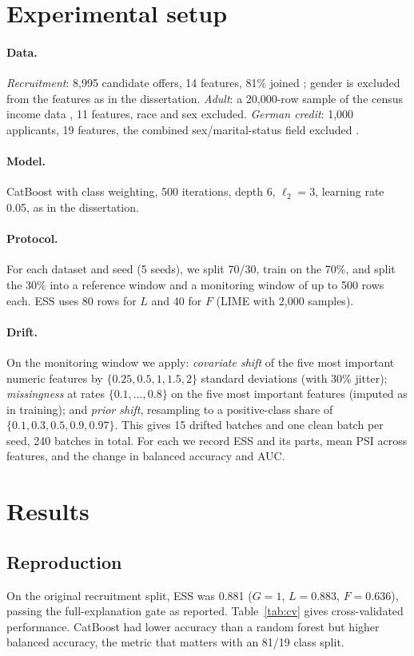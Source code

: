 \documentclass[11pt]{article}
\begin{document}
\section{Experimental setup}
\paragraph{Data.} \emph{Recruitment}: 8{,}995 candidate offers, 14 features, 81\% joined \cite{hrdataset}; gender is excluded from the
features as in the dissertation. \emph{Adult}: a 20{,}000-row sample of the census income data \cite{kohavi1996adult}, 11 features,
race and sex excluded. \emph{German credit}: 1{,}000 applicants, 19 features, the combined sex/marital-status field excluded
\cite{hofmann1994german}.
\paragraph{Model.} CatBoost with class weighting, 500 iterations, depth 6, \(\ell_2=3\), learning rate 0.05, as in the dissertation.
\paragraph{Protocol.} For each dataset and seed (5 seeds), we split 70/30, train on the 70\%, and split the 30\% into a reference
window and a monitoring window of up to 500 rows each. ESS uses 80 rows for \(L\) and 40 for \(F\) (LIME with 2{,}000 samples).
\paragraph{Drift.} On the monitoring window we apply: \emph{covariate shift} of the five most important numeric features by
\(\{0.25, 0.5, 1, 1.5, 2\}\) standard deviations (with 30\% jitter); \emph{missingness} at rates \(\{0.1,\dots,0.8\}\) on the five most
important features (imputed as in training); and \emph{prior shift}, resampling to a positive-class share of
\(\{0.1, 0.3, 0.5, 0.9, 0.97\}\). This gives 15 drifted batches and one clean batch per seed, 240 batches in total. For each we record
ESS and its parts, mean PSI across features, and the change in balanced accuracy and AUC.

\section{Results}
\subsection{Reproduction}
On the original recruitment split, ESS was 0.881 (\(G=1\), \(L=0.883\), \(F=0.636\)), passing the full-explanation gate as reported.
Table~\ref{tab:cv} gives cross-validated performance. CatBoost had lower accuracy than a random forest but higher balanced accuracy,
the metric that matters with an 81/19 class split.
\end{document}
